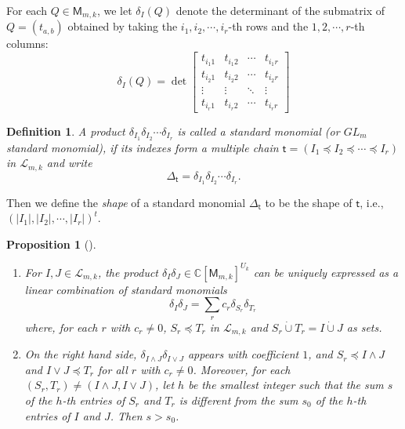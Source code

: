 \documentclass[11pt]{amsart}
\numberwithin{equation}{subsection}
\newtheorem{definition}[theorem]{Definition}
\newtheorem{proposition}[theorem]{Proposition}
\begin{document}
For each $Q \in \mathsf{M}_{m,k}$, we let $\delta _{I}(Q)$ denote the determinant of
the submatrix of $Q=(t_{a,b})$ obtained by taking the
$i_{1},i_{2},\cdots ,i_{r}$-th rows and the $1,2,\cdots ,r$-th columns:
\begin{equation}
\delta _{I}(Q)=\det 
\begin{bmatrix}
t_{i_{1}1} & t_{i_{1}2} & \cdots  & t_{i_{1}r} \\ 
t_{i_{2}1} & t_{i_{2}2} & \cdots  & t_{i_{2}r} \\ 
\vdots  & \vdots  & \ddots  & \vdots  \\ 
t_{i_{r}1} & t_{i_{r}2} & \cdots  & t_{i_{r}r}\end{bmatrix}
\label{determinant}
\end{equation}
\begin{definition}
A product $\delta _{I_{1}}\delta _{I_{2}}\cdots \delta _{I_{r}}$ is
called a \textit{standard monomial} (or \textit{$GL_m$ standard monomial}), 
if its indexes form a multiple
chain $\mathsf{t}=(I_{1}\preceq I_{2}\preceq \cdots \preceq I_{r})$ in 
$\mathcal{L}_{m,k}$ and write
\begin{equation*}
\Delta _{\mathsf{t}}=\delta _{I_{1}}\delta _{I_{2}}\cdots \delta _{I_{r}}.
\end{equation*}
\end{definition}

Then we define the \textit{shape} of a standard monomial $\Delta _{\mathsf{t}}$
to be the shape of $\mathsf{t}$, i.e., $(|I_1|, |I_2|, \cdots, |I_r|)^t$.

\begin{proposition}[{\protect\cite[pp.233,236]{GL01}}]\label{straightening1}
\begin{enumerate}
\item For $I,J\in \mathcal{L}_{m,k}$, the product $\delta _{I}\delta _{J}
\in \mathbb{C}[\mathsf{M}_{m,k}]^{U_{k}}$ can
be uniquely expressed as a linear combination of standard monomials
\begin{equation}
\delta _{I}\delta _{J}=\sum_{r}c_{r}\delta _{S_{r}}\delta _{T_{r}}
\label{straightening}
\end{equation}
where, for each $r$ with $c_r \ne 0$, $S_{r}\preceq T_{r}$ in $\mathcal{L}_{m,k}$ 
and  $S_{r}\dot{\cup} T_{r} = I \dot{\cup} J$ as sets.

\item On the right hand side, $\delta _{I\wedge J}\delta _{I\vee J}$ appears
with coefficient $1$, and $S_{r}\preceq I\wedge J$ and $I\vee J\preceq
T_{r} $ for all $r$ with $c_r \ne 0$. Moreover, for each $(S_{r},T_{r})\neq (I\wedge J,
I \vee J)$, let $h$ be the smallest integer such that the sum $s$ of the $h$-th
entries of $S_{r}$ and $T_{r}$ is different from the sum $s_{0}$ of the 
$h$-th entries of $I$ and $J$. Then $s>s_{0}$.
\end{enumerate}
\end{proposition}
\end{document}
